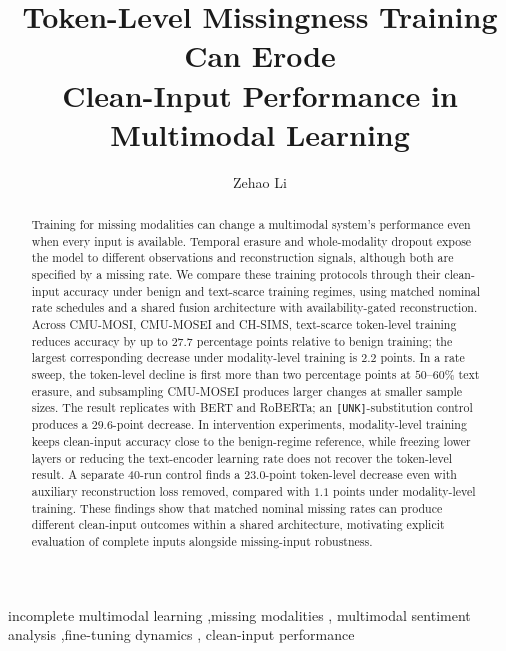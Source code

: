 \documentclass[preprint,11pt]{elsarticle}
\begin{document}
\begin{frontmatter}

\title{Token-Level Missingness Training Can Erode\\
       Clean-Input Performance in Multimodal Learning}

\author[a]{Zehao Li}

\begin{abstract}
Training for missing modalities can change a multimodal system's performance
even when every input is available. Temporal erasure and whole-modality
dropout expose the model to different observations and reconstruction signals,
although both are specified by a missing rate. We compare these training
protocols through their clean-input accuracy under benign and text-scarce
training regimes, using matched nominal rate schedules and a shared fusion
architecture with availability-gated reconstruction. Across CMU-MOSI,
CMU-MOSEI and CH-SIMS, text-scarce token-level
training reduces accuracy by up to $27.7$ percentage points relative to benign
training; the largest corresponding decrease under modality-level training is
$2.2$ points. In a rate sweep, the token-level decline is first more than two
percentage points at $50$--$60\%$ text erasure,
and subsampling CMU-MOSEI produces larger changes at smaller sample sizes.
The result replicates with BERT and RoBERTa; an \texttt{[UNK]}-substitution
control produces a $29.6$-point decrease. In intervention experiments,
modality-level training keeps clean-input accuracy close to the benign-regime
reference, while freezing lower layers or reducing the text-encoder learning
rate does not recover the token-level result. A separate 40-run control finds
a $23.0$-point token-level decrease even with auxiliary reconstruction loss
removed, compared with $1.1$ points under modality-level training.
These findings show that matched
nominal missing rates can produce different clean-input outcomes within a
shared architecture, motivating explicit evaluation of complete inputs
alongside missing-input robustness.
\end{abstract}

\begin{keyword}
incomplete multimodal learning \sep missing modalities \sep
multimodal sentiment analysis \sep fine-tuning dynamics \sep
clean-input performance
\end{keyword}

\end{frontmatter}
\end{document}
